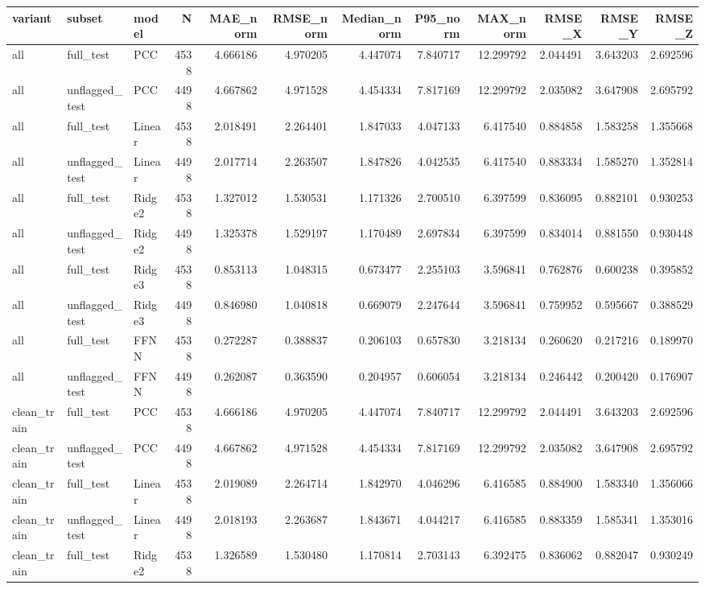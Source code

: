 \begin{tabular}{lllrrrrrrrrr}
\toprule
variant & subset & model & N & MAE_norm & RMSE_norm & Median_norm & P95_norm & MAX_norm & RMSE_X & RMSE_Y & RMSE_Z \\
\midrule
all & full_test & PCC & 4538 & 4.666186 & 4.970205 & 4.447074 & 7.840717 & 12.299792 & 2.044491 & 3.643203 & 2.692596 \\
all & unflagged_test & PCC & 4498 & 4.667862 & 4.971528 & 4.454334 & 7.817169 & 12.299792 & 2.035082 & 3.647908 & 2.695792 \\
all & full_test & Linear & 4538 & 2.018491 & 2.264401 & 1.847033 & 4.047133 & 6.417540 & 0.884858 & 1.583258 & 1.355668 \\
all & unflagged_test & Linear & 4498 & 2.017714 & 2.263507 & 1.847826 & 4.042535 & 6.417540 & 0.883334 & 1.585270 & 1.352814 \\
all & full_test & Ridge2 & 4538 & 1.327012 & 1.530531 & 1.171326 & 2.700510 & 6.397599 & 0.836095 & 0.882101 & 0.930253 \\
all & unflagged_test & Ridge2 & 4498 & 1.325378 & 1.529197 & 1.170489 & 2.697834 & 6.397599 & 0.834014 & 0.881550 & 0.930448 \\
all & full_test & Ridge3 & 4538 & 0.853113 & 1.048315 & 0.673477 & 2.255103 & 3.596841 & 0.762876 & 0.600238 & 0.395852 \\
all & unflagged_test & Ridge3 & 4498 & 0.846980 & 1.040818 & 0.669079 & 2.247644 & 3.596841 & 0.759952 & 0.595667 & 0.388529 \\
all & full_test & FFNN & 4538 & 0.272287 & 0.388837 & 0.206103 & 0.657830 & 3.218134 & 0.260620 & 0.217216 & 0.189970 \\
all & unflagged_test & FFNN & 4498 & 0.262087 & 0.363590 & 0.204957 & 0.606054 & 3.218134 & 0.246442 & 0.200420 & 0.176907 \\
clean_train & full_test & PCC & 4538 & 4.666186 & 4.970205 & 4.447074 & 7.840717 & 12.299792 & 2.044491 & 3.643203 & 2.692596 \\
clean_train & unflagged_test & PCC & 4498 & 4.667862 & 4.971528 & 4.454334 & 7.817169 & 12.299792 & 2.035082 & 3.647908 & 2.695792 \\
clean_train & full_test & Linear & 4538 & 2.019089 & 2.264714 & 1.842970 & 4.046296 & 6.416585 & 0.884900 & 1.583340 & 1.356066 \\
clean_train & unflagged_test & Linear & 4498 & 2.018193 & 2.263687 & 1.843671 & 4.044217 & 6.416585 & 0.883359 & 1.585341 & 1.353016 \\
clean_train & full_test & Ridge2 & 4538 & 1.326589 & 1.530480 & 1.170814 & 2.703143 & 6.392475 & 0.836062 & 0.882047 & 0.930249 \\

\end{tabular}
